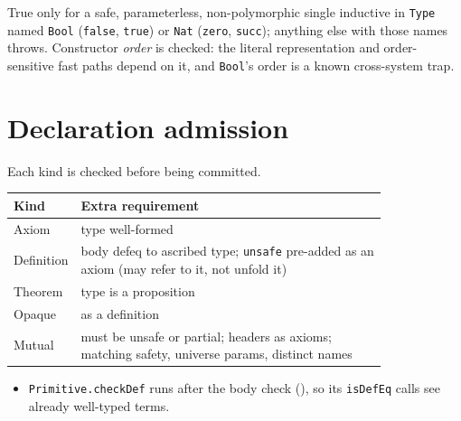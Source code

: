 \begin{definition}
\label{def:kernel-primitive-checkinductive}
\leanok
{} True only for a safe, parameterless, non-polymorphic single inductive in
\texttt{Type} named \texttt{Bool} (\texttt{false}, \texttt{true}) or \texttt{Nat} (\texttt{zero},
\texttt{succ}); anything else with those names throws. Constructor \emph{order} is checked: the
literal representation and order-sensitive fast paths depend on it, and \texttt{Bool}'s order is a
known cross-system trap.
\end{definition}

\section{Declaration admission}

\begin{definition}
\label{family:kernel-add-decls}
\leanok
{}

 Each kind is checked before being committed.
\par\smallskip\noindent
\begin{tabular}{lp{0.82\linewidth}}
\toprule
Kind & Extra requirement \\
\midrule
Axiom & type well-formed \\
Definition & body defeq to ascribed type; \texttt{unsafe} pre-added as an axiom (may refer to
it, not unfold it) \\
Theorem & type is a proposition \\
Opaque & as a definition \\
Mutual & must be unsafe or partial; headers as axioms; matching safety, universe params,
distinct names \\
\bottomrule
\end{tabular}\par\smallskip
\begin{itemize}
\item {} \texttt{Primitive.checkDef} runs after the body check
(), so its \texttt{isDefEq} calls see already well-typed
terms.
\end{itemize}
\end{definition}

